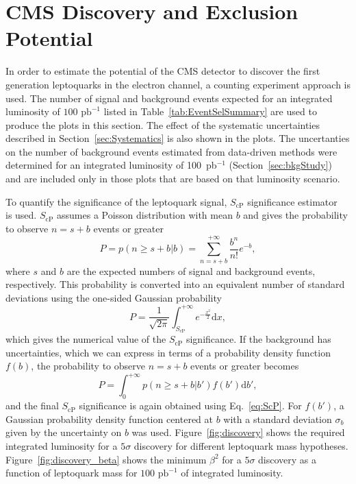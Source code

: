 %

\section{CMS Discovery and Exclusion Potential} \label{CMSpotential}

In order to estimate the potential of the CMS detector to discover the first generation leptoquarks
in the electron channel, a counting experiment approach is used. 
The number of signal and background events expected for an integrated luminosity of
$100\text{ pb}^{-1}$ listed in Table~\ref{tab:EventSelSummary} 
are used to produce the plots in this section.
The effect of the systematic uncertainties described in Section~\ref{sec:Systematics} is also shown in the plots. 
The uncertanties on the number of background events estimated from data-driven methods were determined for 
an integrated luminosity of 100~pb$^{-1}$
(Section~\ref{sec:bkgStudy}) and are included only in those plots that are based on that luminosity scenario.  


To quantify the significance of the
leptoquark signal, $S_\text{cP}$ significance estimator~\cite{Bityukov:2005hg} is used. $S_\text{cP}$ assumes a Poisson distribution
with mean $b$ and gives the probability to observe $n=s+b$ events or greater
\begin{equation}
P = p(n\geq s+b|b) = \sum_{n=s+b}^{+\infty} \frac{b^n}{n!}e^{-b},
\end{equation}
where $s$ and $b$ are the expected numbers of signal and background events, respectively. This probability is 
converted into an equivalent number of standard deviations using the one-sided Gaussian probability
\begin{equation}
P = \frac{1}{\sqrt{2\pi}}\int_{S_\text{cP}}^{+\infty} e^{-\frac{x^2}{2}}\mathrm{d}x,
\label{eq:ScP}
\end{equation}
which gives the numerical value of the $S_\text{cP}$ significance. If the background has uncertainties, which we can express in terms of
a probability density function $f(b)$, the probability to observe $n=s+b$ events or greater becomes
\begin{equation}
P = \int_0^{+\infty} p(n\geq s+b|b')f(b')\mathrm{d}b',
\end{equation}
and the final $S_\text{cP}$ significance is again obtained using Eq.~\ref{eq:ScP}. For $f(b')$, a Gaussian probability density function
centered at $b$ with a standard deviation $\sigma_b$ given by the uncertainty on $b$ was used. 
Figure~\ref{fig:discovery} shows the required integrated luminosity for a $5\sigma$ discovery for different leptoquark mass hypotheses. 
Figure~\ref{fig:discovery_beta} shows the minimum $\beta^2$ for a $5\sigma$ discovery as a function of leptoquark mass for $100\text{ pb}^{-1}$ 
of integrated luminosity.

